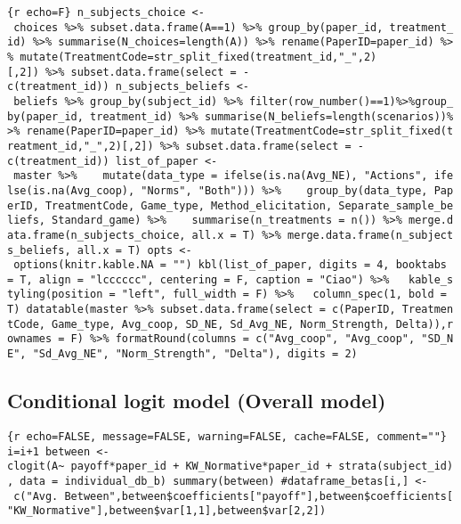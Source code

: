 \texttt{\{r\ echo=F\}\ n\_subjects\_choice\ \textless{}-\ choices\ \%\textgreater{}\%\ subset.data.frame(A==1)\ \%\textgreater{}\%\ group\_by(paper\_id,\ treatment\_id)\ \%\textgreater{}\%\ summarise(N\_choices=length(A))\ \%\textgreater{}\%\ rename(PaperID=paper\_id)\ \%\textgreater{}\%\ mutate(TreatmentCode=str\_split\_fixed(treatment\_id,"\_",2){[},2{]})\ \%\textgreater{}\%\ subset.data.frame(select\ =\ -c(treatment\_id))\ n\_subjects\_beliefs\ \textless{}-\ beliefs\ \%\textgreater{}\%\ group\_by(subject\_id)\ \%\textgreater{}\%\ filter(row\_number()==1)\%\textgreater{}\%group\_by(paper\_id,\ treatment\_id)\ \%\textgreater{}\%\ summarise(N\_beliefs=length(scenarios))\%\textgreater{}\%\ rename(PaperID=paper\_id)\ \%\textgreater{}\%\ mutate(TreatmentCode=str\_split\_fixed(treatment\_id,"\_",2){[},2{]})\ \%\textgreater{}\%\ subset.data.frame(select\ =\ -c(treatment\_id))\ list\_of\_paper\ \textless{}-\ master\ \%\textgreater{}\%\ \ \ \ mutate(data\_type\ =\ ifelse(is.na(Avg\_NE),\ "Actions",\ ifelse(is.na(Avg\_coop),\ "Norms",\ "Both")))\ \%\textgreater{}\%\ \ \ \ group\_by(data\_type,\ PaperID,\ TreatmentCode,\ Game\_type,\ Method\_elicitation,\ Separate\_sample\_beliefs,\ Standard\_game)\ \%\textgreater{}\%\ \ \ \ summarise(n\_treatments\ =\ n())\ \%\textgreater{}\%\ merge.data.frame(n\_subjects\_choice,\ all.x\ =\ T)\ \%\textgreater{}\%\ merge.data.frame(n\_subjects\_beliefs,\ all.x\ =\ T)\ opts\ \textless{}-\ options(knitr.kable.NA\ =\ "")\ kbl(list\_of\_paper,\ digits\ =\ 4,\ booktabs\ =\ T,\ align\ =\ "lcccccc",\ centering\ =\ F,\ caption\ =\ "Ciao")\ \%\textgreater{}\%\ \ \ kable\_styling(position\ =\ "left",\ full\_width\ =\ F)\ \%\textgreater{}\%\ \ \ column\_spec(1,\ bold\ =\ T)\ datatable(master\ \%\textgreater{}\%\ subset.data.frame(select\ =\ c(PaperID,\ TreatmentCode,\ Game\_type,\ Avg\_coop,\ SD\_NE,\ Sd\_Avg\_NE,\ Norm\_Strength,\ Delta)),rownames\ =\ F)\ \%\textgreater{}\%\ formatRound(columns\ =\ c("Avg\_coop",\ "Avg\_coop",\ "SD\_NE",\ "Sd\_Avg\_NE",\ "Norm\_Strength",\ "Delta"),\ digits\ =\ 2)}

\hypertarget{conditional-logit-model-overall-model}{%
\subsection{Conditional logit model (Overall
model)}\label{conditional-logit-model-overall-model}}

\texttt{\{r\ echo=FALSE,\ message=FALSE,\ warning=FALSE,\ cache=FALSE,\ comment=""\}\ i=i+1\ between\ \textless{}-clogit(A\textasciitilde{}\ payoff*paper\_id\ +\ KW\_Normative*paper\_id\ +\ strata(subject\_id),\ data\ =\ individual\_db\_b)\ summary(between)\ \#dataframe\_betas{[}i,{]}\ \textless{}-\ c("Avg.\ Between",between\$coefficients{[}"payoff"{]},between\$coefficients{[}"KW\_Normative"{]},between\$var{[}1,1{]},between\$var{[}2,2{]})}

